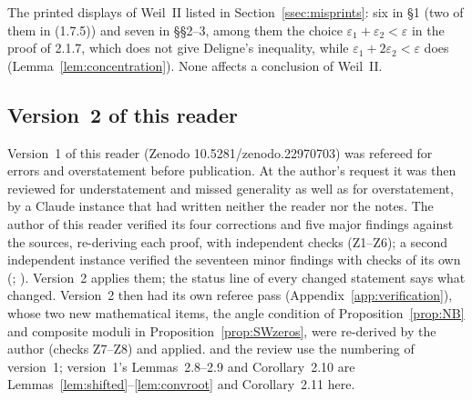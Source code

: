 The printed displays of Weil~II listed in Section~\ref{ssec:misprints}: six in §1 (two of them in (1.7.5)) and seven in §§2--3, among them the choice $\varepsilon_1+\varepsilon_2<\varepsilon$ in the proof of 2.1.7, which does not give Deligne's inequality, while $\varepsilon_1+2\varepsilon_2<\varepsilon$ does (Lemma~\ref{lem:concentration}). None affects a conclusion of Weil~II.

\subsection{Version~2 of this reader}

Version~1 of this reader (Zenodo 10.5281/zenodo.22970703) was refereed for errors and overstatement before publication. At the author's request it was then reviewed for understatement and missed generality as well as for overstatement, by a Claude instance that had written neither the reader nor the notes. The author of this reader verified its four corrections and five major findings against the sources, re-deriving each proof, with independent checks (Z1--Z6); a second independent instance verified the seventeen minor findings with checks of its own (; ). Version~2 applies them; the status line of every changed statement says what changed. Version~2 then had its own referee pass (Appendix~\ref{app:verification}), whose two new mathematical items, the angle condition of Proposition~\ref{prop:NB} and composite moduli in Proposition~\ref{prop:SWzeros}, were re-derived by the author (checks Z7--Z8) and applied.  and the review use the numbering of version~1; version~1's Lemmas~2.8--2.9 and Corollary~2.10 are Lemmas~\ref{lem:shifted}--\ref{lem:convroot} and Corollary~2.11 here.


